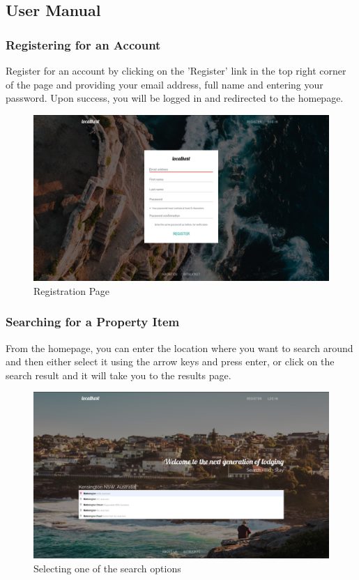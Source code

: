 \newpage
\subsection{User Manual}
\subsubsection{Registering for an Account}
Register for an account by clicking on the 'Register' link in the top right
corner of the page and providing your email address, full name and entering
your password. Upon success, you will be logged in and redirected to the
homepage.

\begin{figure}[!h]
  \includegraphics[width=\linewidth]{assets/userManual/regPg.png}
  \caption{Registration Page}
  \label{fig:regPg}
\end{figure}

\newpage
\subsubsection{Searching for a Property Item}
From the homepage, you can enter the location where you want to search around
and then either select it using the arrow keys and press enter, or click on the
search result and it will take you to the results page.

\begin{figure}[!h]
  \includegraphics[width=\linewidth]{assets/userManual/searchOption.png}
  \caption{Selecting one of the search options}
  \label{fig:searchOption}
\end{figure}

